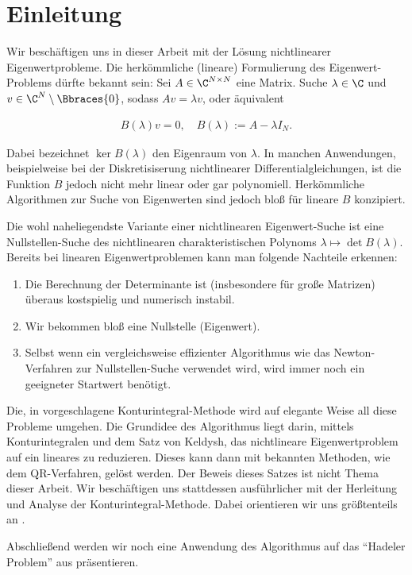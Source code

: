 \chapter{Einleitung}

Wir beschäftigen uns in dieser Arbeit mit der Lösung nichtlinearer Eigenwertprobleme.
Die herkömmliche (lineare) Formulierung des Eigenwert-Problems dürfte bekannt sein:
Sei $A \in \C^{N \times N}$ eine Matrix.
Suche $\lambda \in \C$ und $v \in \C^N \setminus \Bbraces{0}$, sodass $A v = \lambda v$, oder äquivalent

\begin{align} \label{eq:lineares_ewp}
    B(\lambda) v = 0,
    \quad
    B(\lambda) := A - \lambda I_N.
\end{align}

Dabei bezeichnet $\ker B(\lambda)$ den Eigenraum von $\lambda$.
In manchen Anwendungen, beispielweise bei der Diskretisiserung nichtlinearer Differentialgleichungen, ist die Funktion $B$ jedoch nicht mehr linear oder gar polynomiell.
Herkömmliche Algorithmen zur Suche von Eigenwerten sind jedoch bloß für lineare $B$ konzipiert.

Die wohl naheliegendste Variante einer nichtlinearen Eigenwert-Suche ist eine Nullstellen-Suche des nichtlinearen charakteristischen Polynoms $\lambda \mapsto \det B(\lambda)$.
Bereits bei linearen Eigenwertproblemen kann man folgende Nachteile erkennen:

\begin{enumerate}[label = \arabic*.]
    \item Die Berechnung der Determinante ist (insbesondere für große Matrizen) überaus kostspielig und numerisch instabil.
    \item Wir bekommen bloß eine Nullstelle (Eigenwert).
    \item Selbst wenn ein vergleichsweise effizienter Algorithmus wie das Newton-Verfahren zur Nullstellen-Suche verwendet wird, wird immer noch ein geeigneter Startwert benötigt.
\end{enumerate}

Die, in \cite{BEYN20123839} vorgeschlagene Konturintegral-Methode wird auf elegante Weise all diese Probleme umgehen.
Die Grundidee des Algorithmus liegt darin, mittels Konturintegralen und dem Satz von Keldysh, das nichtlineare Eigenwertproblem auf ein lineares zu reduzieren.
Dieses kann dann mit bekannten Methoden, wie dem QR-Verfahren, gelöst werden.
Der Beweis dieses Satzes ist nicht Thema dieser Arbeit.
Wir beschäftigen uns stattdessen ausführlicher mit der Herleitung und Analyse der Konturintegral-Methode.
Dabei orientieren wir uns größtenteils an \cite{EWPs}.

Abschließend werden wir noch eine Anwendung des Algorithmus auf das \enquote{Hadeler Problem} aus \cite{saad2020rational} präsentieren.
